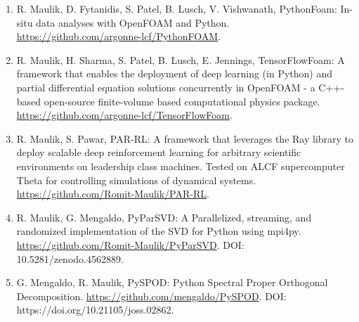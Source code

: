 \documentclass[letterpaper]{article}
\renewenvironment{itemize}{
  \begin{list}{}{
    \setlength{\leftmargin}{1.5em}
  }
}{
  \end{list}
}
\begin{document}
\begin{enumerate}

\item R. Maulik, D. Fytanidis, S. Patel, B. Lusch, V. Vishwanath, PythonFoam: In-situ data analyses with OpenFOAM and Python. \url{https://github.com/argonne-lcf/PythonFOAM}.

\item R. Maulik, H. Sharma, S. Patel, B. Lusch, E. Jennings, TensorFlowFoam: A framework that enables the deployment of deep learning (in Python) and partial differential equation solutions concurrently in OpenFOAM - a C++-based open-source finite-volume based computational physics package. \url{https://github.com/argonne-lcf/TensorFlowFoam}.

\item R. Maulik, S. Pawar, PAR-RL: A framework that leverages the Ray library to deploy scalable deep reinforcement learning for arbitrary scientific environments on leadership class machines. Tested on ALCF supercomputer Theta for controlling simulations of dynamical systems. \url{https://github.com/Romit-Maulik/PAR-RL}.

\item R. Maulik, G. Mengaldo, PyParSVD: A Parallelized, streaming, and randomized implementation of the SVD for Python using mpi4py. \url{https://github.com/Romit-Maulik/PyParSVD}. DOI: 10.5281/zenodo.4562889.

\item G. Mengaldo, R. Maulik, PySPOD: Python Spectral Proper Orthogonal Decomposition. \url{https://github.com/mengaldo/PySPOD}.  DOI: https://doi.org/10.21105/joss.02862.

\end{enumerate}




\end{document}
